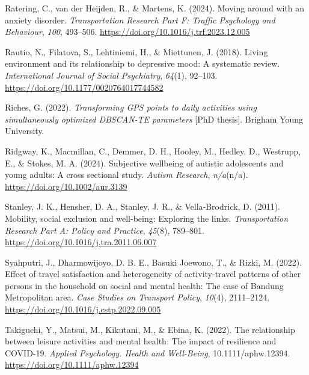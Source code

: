 \documentclass[
  letterpaper,
  number,
  review,
  3p]{elsarticle}
\newlength{\cslhangindent}
\newenvironment{CSLReferences}[2] %
 {\begin{list}{}{%
  \setlength{\itemindent}{0pt}
  \setlength{\leftmargin}{0pt}
  \setlength{\parsep}{0pt}
  \ifodd #1
   \setlength{\leftmargin}{\cslhangindent}
   \setlength{\itemindent}{-1\cslhangindent}
  \fi
  \setlength{\itemsep}{#2\baselineskip}}}
 {\end{list}}
\begin{document}
\begin{CSLReferences}{1}{0}
Ratering, C., van der Heijden, R., \& Martens, K. (2024). Moving around
with an anxiety disorder. \emph{Transportation Research Part F: Traffic
Psychology and Behaviour}, \emph{100}, 493--506.
\url{https://doi.org/10.1016/j.trf.2023.12.005}

Rautio, N., Filatova, S., Lehtiniemi, H., \& Miettunen, J. (2018).
Living environment and its relationship to depressive mood: {A}
systematic review. \emph{International Journal of Social Psychiatry},
\emph{64}(1), 92--103. \url{https://doi.org/10.1177/0020764017744582}

Riches, G. (2022). \emph{Transforming {GPS} points to daily activities
using simultaneously optimized {DBSCAN-TE} parameters} {[}PhD thesis{]}.
Brigham Young University.

Ridgway, K., Macmillan, C., Demmer, D. H., Hooley, M., Hedley, D.,
Westrupp, E., \& Stokes, M. A. (2024). Subjective wellbeing of autistic
adolescents and young adults: {A} cross sectional study. \emph{Autism
Research}, \emph{n/a}(n/a). \url{https://doi.org/10.1002/aur.3139}

Stanley, J. K., Hensher, D. A., Stanley, J. R., \& Vella-Brodrick, D.
(2011). Mobility, social exclusion and well-being: {Exploring} the
links. \emph{Transportation Research Part A: Policy and Practice},
\emph{45}(8), 789--801. \url{https://doi.org/10.1016/j.tra.2011.06.007}

Syahputri, J., Dharmowijoyo, D. B. E., Basuki Joewono, T., \& Rizki, M.
(2022). Effect of travel satisfaction and heterogeneity of
activity-travel patterns of other persons in the household on social and
mental health: {The} case of {Bandung Metropolitan} area. \emph{Case
Studies on Transport Policy}, \emph{10}(4), 2111--2124.
\url{https://doi.org/10.1016/j.cstp.2022.09.005}

Takiguchi, Y., Matsui, M., Kikutani, M., \& Ebina, K. (2022). The
relationship between leisure activities and mental health: {The} impact
of resilience and {COVID}-19. \emph{Applied Psychology. Health and
Well-Being}, 10.1111/aphw.12394.
\url{https://doi.org/10.1111/aphw.12394}


\end{CSLReferences}
\end{document}
